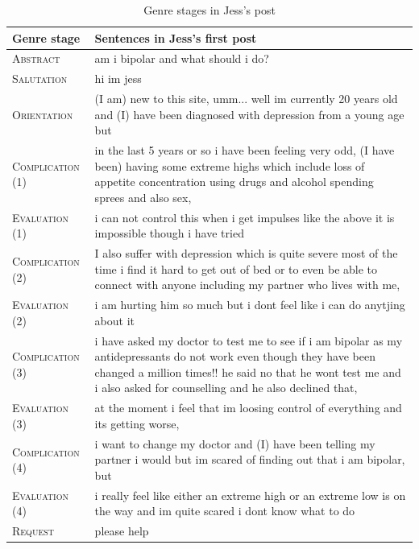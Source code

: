 \documentclass{article}
\begin{document}
{\begin{table}[htb]
\begin{tabularx}{\textwidth}{lX}
\toprule
Genre stage  & Sentences in Jess's first post   \\ \midrule
\textsc{Abstract }    & am i bipolar and what should i do? \\ 
\textsc{Salutation}   & hi im jess   \\ 
\textsc{Orientation}  & (I am) new to this site,  umm... well im currently 20 years old and (I) have been diagnosed with depression from a young age but \\ 
\textsc{Complication (1)} & in the last 5 years or so i have been feeling very odd, (I have been) having some extreme highs which include loss of appetite concentration using drugs and alcohol spending sprees and also sex, \\ 
\textsc{Evaluation (1)}   & i can not control this when i get impulses like the above it is impossible though i have tried \\ 
\textsc{Complication (2)} & I also suffer with depression which is quite severe most of the time i find it hard to get out of bed or to even be able to connect with anyone including my partner who lives with me,   \\ 
\textsc{Evaluation (2)}   &  i am hurting him so much but i dont feel like i can do anytjing about it   \\ 
\textsc{Complication (3)} & i have asked my doctor to test me to see if i am bipolar as my antidepressants do not work even though they have been changed a million times!! he said no that he wont test me and i also asked for counselling and he also declined that, \\ 
\textsc{Evaluation (3)} & at the moment i feel that im loosing control of everything and its getting worse, \\ 
\textsc{Complication (4)} &  i want to change my doctor and (I) have been telling my partner i would but im scared of finding out that i am bipolar, but  \\ 
\textsc{Evaluation (4)}   & i really feel like either an extreme high or an extreme low is on the way and im quite scared i dont know what to do  \\ 
\textsc{Request}     & please help   \\ \bottomrule
\end{tabularx}
\caption{Genre stages in Jess's post}
\label{jess-genre}
\end{table}
%
}
\end{document}
